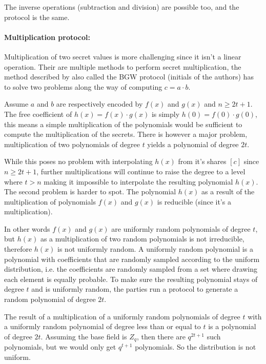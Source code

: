 The inverse operations (subtraction and division) are possible too, and the protocol is the same.

\paragraph{Multiplication protocol:}
Multiplication of two secret values is more challenging since it isn't a linear operation. Their are multiple methods to perform secret multiplication, the method described by \cite{ben1988completeness} also called the BGW protocol (initials of the authors) has to solve two problems along the way of computing $c = a \cdot b$.

Assume $a$ and $b$ are respectively encoded by $f(x)$ and $g(x)$ and $n \geq 2t + 1$. The free coefficient of $h(x) = f(x) \cdot g(x)$ is simply $h(0) = f(0) \cdot g(0)$, this means a simple multiplication of the polynomials would be sufficient to compute the multiplication of the secrets. There is however a major problem, multiplication of two polynomials of degree $t$ yields a polynomial of degree $2t$.

While this poses no problem with interpolating $h(x)$ from it's shares $[c]$ since $n \geq 2t + 1$, further multiplications will continue to raise the degree to a level where $t>n$ making it impossible to interpolate the resulting polynomial $h(x)$. The second problem is harder to spot.
The polynomial $h(x)$ as a result of the multiplication of polynomials $f(x)$ and $g(x)$ is reducible (since it's a multiplication).

In other words $f(x)$ and $g(x)$ are uniformly random polynomials of degree $t$, but $h(x)$ as a multiplication of two random polynomials is not irreducible, therefore $h(x)$ is not uniformly random. A uniformly random polynomial is a polynomial with coefficients that are randomly sampled according to the uniform distribution, i.e. the coefficients are randomly sampled from a set where drawing each element is equally probable. To make sure the resulting polynomial stays of degree $t$ and is uniformly random, the parties run a protocol to generate a random polynomial of degree $2t$.

The result of a multiplication of a uniformly random polynomials of degree $t$ with a uniformly random polynomial of degree less than or equal to $t$ is a polynomial of degree $2t$. Assuming the base field is $Z_q$, then there are $q^{2t+1}$ such polynomials, but we would only get $q^{t+1}$ polynomials. So the distribution is not uniform.


